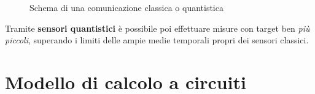 \documentclass[../../InformazioneQuantistica.tex]{subfiles}
\begin{document}
\begin{figure}[H]
\centering

\caption{Schema di una comunicazione classica o quantistica\label{fig:comunicazione-classica-quantistica}}
\end{figure}

Tramite \textbf{sensori quantistici} è possibile poi effettuare misure con target ben \textit{più piccoli}, superando i limiti delle ampie medie temporali propri dei sensori classici.

\section{Modello di calcolo a circuiti}
\end{document}
